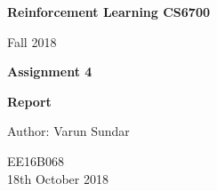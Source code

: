 \begin{titlepage}
    \begin{center}
        \vspace*{1cm}
        
        \Huge
          \textbf{Reinforcement Learning CS6700}
        
        \vspace{0.5cm}
        \LARGE
        Fall 2018
        
        \vspace{1.5cm}
        
        \textbf{Assignment 4}
   		  \vspace{1.5cm}
        
        \textbf{Report}
       
        \vfill
        
        Author: Varun Sundar
        
        \vspace{0.8cm}
          \Large
        EE16B068 \\
        \vspace{0.5cm}
       18th October 2018
        
    \end{center}
\end{titlepage}